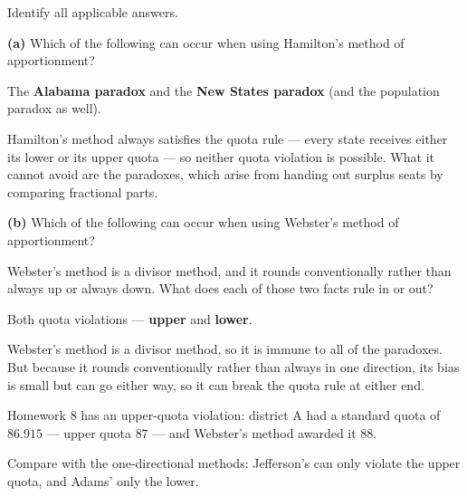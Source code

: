 \documentclass[12pt]{ximera}
\begin{document}
\begin{problem}
Identify all applicable answers.

\begin{prompt}
\textbf{(a)} Which of the following can occur when using Hamilton's method of
apportionment?

\begin{selectAll}
\end{selectAll}

\begin{feedback}
The \textbf{Alabama paradox} and the \textbf{New States paradox} (and the population
paradox as well).

Hamilton's method always satisfies the quota rule --- every state receives either its
lower or its upper quota --- so neither quota violation is possible. What it cannot avoid
are the paradoxes, which arise from handing out surplus seats by comparing fractional
parts.
\end{feedback}
\end{prompt}

\begin{prompt}
\textbf{(b)} Which of the following can occur when using Webster's method of
apportionment?

\begin{selectAll}
\end{selectAll}

\begin{hint}
Webster's method is a divisor method, and it rounds conventionally rather than always up
or always down. What does each of those two facts rule in or out?
\end{hint}

\begin{feedback}
Both quota violations --- \textbf{upper} and \textbf{lower}.

Webster's method is a divisor method, so it is immune to all of the paradoxes. But
because it rounds conventionally rather than always in one direction, its bias is small
but can go either way, so it can break the quota rule at either end.

Homework 8 has an upper-quota violation: district A had a standard quota of $86.915$ ---
upper quota $87$ --- and Webster's method awarded it $88$.

Compare with the one-directional methods: Jefferson's can only violate the upper quota,
and Adams' only the lower.
\end{feedback}
\end{prompt}
\end{problem}
\end{document}
